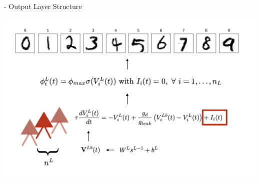 \documentclass[dvipsnames, usenames]{beamer}
\begin{document}
\begin{frame}[noframenumbering]{\citet{guerguiev2017} - Output Layer Structure}

\centering 
\includegraphics[width=1.1\textwidth]{../figures/report/out_2}
\end{frame}
\end{document}
